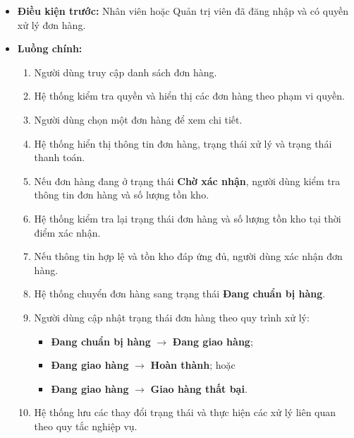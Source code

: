 \documentclass[12pt,a4paper]{article}
\begin{document}
\begin{itemize}

\item \textbf{Điều kiện trước:} Nhân viên hoặc Quản trị viên đã đăng nhập và có quyền xử lý đơn hàng.

\item \textbf{Luồng chính:}
\begin{enumerate}

    \item Người dùng truy cập danh sách đơn hàng.

    \item Hệ thống kiểm tra quyền và hiển thị các đơn hàng theo phạm vi quyền.

    \item Người dùng chọn một đơn hàng để xem chi tiết.

    \item Hệ thống hiển thị thông tin đơn hàng, trạng thái xử lý và trạng thái thanh toán.

    \item Nếu đơn hàng đang ở trạng thái \textbf{Chờ xác nhận}, người dùng kiểm tra thông tin đơn hàng và số lượng tồn kho.

    \item Hệ thống kiểm tra lại trạng thái đơn hàng và số lượng tồn kho tại thời điểm xác nhận.

    \item Nếu thông tin hợp lệ và tồn kho đáp ứng đủ, người dùng xác nhận đơn hàng.

    \item Hệ thống chuyển đơn hàng sang trạng thái \textbf{Đang chuẩn bị hàng}.

    \item Người dùng cập nhật trạng thái đơn hàng theo quy trình xử lý:
    \begin{itemize}
        \item \textbf{Đang chuẩn bị hàng} $\rightarrow$ \textbf{Đang giao hàng};
        \item \textbf{Đang giao hàng} $\rightarrow$ \textbf{Hoàn thành}; hoặc
        \item \textbf{Đang giao hàng} $\rightarrow$ \textbf{Giao hàng thất bại}.
    \end{itemize}

    \item Hệ thống lưu các thay đổi trạng thái và thực hiện các xử lý liên quan theo quy tắc nghiệp vụ.

\end{enumerate}


\end{itemize}
\end{document}
